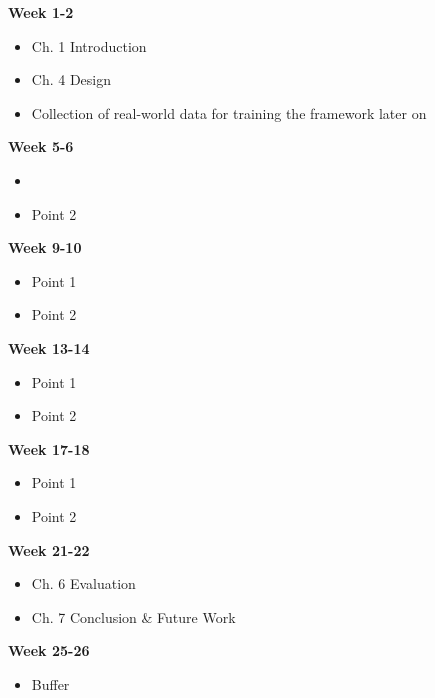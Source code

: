 \documentclass[a4paper,11pt]{article}
\begin{document}
\begin{minipage}[t]{.45\textwidth}
    \textbf{Week 1-2}
    \begin{itemize}
        \item Ch. 1 Introduction
        \item Ch. 4 Design
        \item Collection of real-world data for training the framework later on
    \end{itemize}
    \textbf{Week 5-6}
    \begin{itemize}
        \item 
        \item Point 2
    \end{itemize}
    \textbf{Week 9-10}
    \begin{itemize}
        \item Point 1
        \item Point 2
    \end{itemize}
    \textbf{Week 13-14}
    \begin{itemize}
        \item Point 1
        \item Point 2
    \end{itemize}
    \textbf{Week 17-18}
    \begin{itemize}
        \item Point 1
        \item Point 2
    \end{itemize}
    \textbf{Week 21-22}
    \begin{itemize}
        \item Ch. 6 Evaluation
        \item Ch. 7 Conclusion \& Future Work
    \end{itemize}
    \textbf{Week 25-26}
    \begin{itemize}
        \item Buffer
    \end{itemize}
\end{minipage}
\hfill
\end{document}
